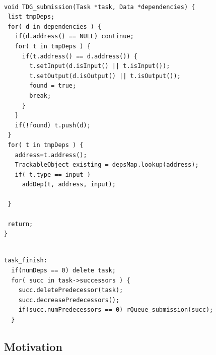 \begin{lstlisting}[float, emph={void,if,return,Dependency,DepList,Data,not,true,and,break}, captionpos=b, caption={Pseudo-code for the SRT loop.},label=SRTloop, emph={[2]mat}, emphstyle={[2]}, aboveskip={0\baselineskip}, frame=tb, belowskip={0\baselineskip}]

void TDG_submission(Task *task, Data *dependencies) {
 list tmpDeps;
 for( d in dependencies ) {
   if(d.address() == NULL) continue;
   for( t in tmpDeps ) {
     if(t.address() == d.address()) {
       t.setInput(d.isInput() || t.isInput());
       t.setOutput(d.isOutput() || t.isOutput());
       found = true;
       break;
     }
   }
   if(!found) t.push(d); 
 }
 for( t in tmpDeps ) {
   address=t.address();
   TrackableObject existing = depsMap.lookup(address);
   if( t.type == input ) 
     addDep(t, address, input);
   
 }
 
 return;
}
\end{lstlisting}
\fi

\begin{lstlisting}[float, emph={void,if,return,rQueue_submission, not,true,and,break}, captionpos=b, caption={Pseudo-code of the task$_$finish runtime activity.},label=task_finish, emph={[2]mat}, emphstyle={[2]}, aboveskip={0\baselineskip}, frame=tb, belowskip={0\baselineskip}]

task_finish:
  if(numDeps == 0) delete task;
  for( succ in task->successors ) {
    succ.deletePredecessor(task);
    succ.decreasePredecessors();
  	if(succ.numPredecessors == 0) rQueue_submission(succ);
  }
\end{lstlisting}
\fi
\subsection{Motivation}




